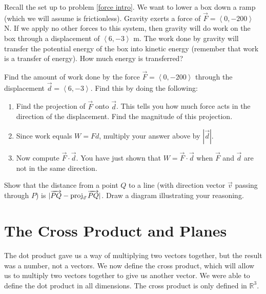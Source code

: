Recall the set up to problem \ref{force intro}.  We want to lower a box down a ramp (which we will assume is frictionless). Gravity exerts a force of $\vec F=\left<0,-200\right>$ N. If we apply no other forces to this system, then gravity will do work on the box through a displacement of $\left<6,-3\right>$ m. The work done by gravity will transfer the potential energy of the box into kinetic energy (remember that work is a transfer of energy).  How much energy is transferred?

\begin{problem} \label{first work problem}
Find the amount of work done by the force $\vec F=\left<0,-200\right>$ through the displacement $\vec d=\left<6,-3\right>$. Find this by doing the following:
\begin{enumerate}
\item Find the projection of $\vec F$ onto $\vec d$. This tells you how much force acts in the direction of the displacement. Find the magnitude of this projection.
\item Since work equals $W=Fd$, multiply your answer above by $|\vec {d}|$.  
\item Now compute $\vec F\cdot \vec d$. You have just shown that $W=\vec F\cdot \vec d$ when $\vec F$ and $\vec d$ are not in the same direction.
\end{enumerate}
\end{problem}




\begin{problem}
  Show that the distance from a point $Q$ to a line (with direction vector $\vec v$ passing through $P$) is $|\overrightarrow{PQ}-\operatorname{proj}_{\vec v}\overrightarrow {PQ}|$. Draw a diagram illustrating your reasoning.
\end{problem}

\section{The Cross Product and Planes}

The dot product gave us a way of multiplying two vectors together, but the result was a number, not a vectors. We now define the cross product, which will allow us to multiply two vectors together to give us another vector.  We were able to define the dot product in all dimensions.  The cross product is only defined in $\mathbb{R}^3$. 

